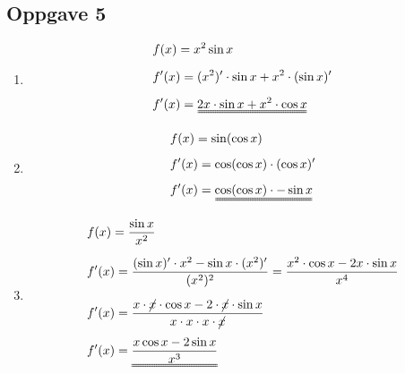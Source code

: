 \documentclass[11pt,a4paper]{report}
\newcommand{\opgd}[1]{\item[#1)]}
\newcommand{\opg}[1]{\subsection*{Oppgave #1}}
\begin{document}

\newpage
\opg{5}
\begin{enumerate}[leftmargin=*,itemsep=0.75cm,labelsep=1.5em,label=\alph*)]
\opgd{a}
\begin{align*}
&f(x) = x^2 \sin x\\[0.2cm]
&f'(x) = (x^2)' \cdot \sin x + x^2 \cdot (\sin x)'\\[0.2cm]
&f'(x) = \uuline{2x \cdot \sin x + x^2 \cdot \cos x}
\end{align*}
\opgd{b}
\begin{align*}
&f(x) = \sin(\cos x)\\[0.2cm]
&f'(x) = \cos(\cos x) \cdot (\cos x)'\\[0.2cm]
&f'(x) = \uuline{\cos(\cos x) \cdot - \sin x}
\end{align*}
\opgd{c}
\begin{align*}
&f(x) = \frac{\sin x}{x^2}\\[0.2cm]
&f'(x) = \frac{(\sin x)' \cdot x^2 - \sin x \cdot (x^2)'}{(x^2)^2} = \frac{x^2 \cdot \cos x - 2x \cdot \sin x}{x^4}\\[0.2cm]
&f'(x) = \frac{x \cdot \cancel{x} \cdot \cos x - 2 \cdot \cancel{x} \cdot \sin x}{x \cdot x \cdot x \cdot \cancel{x}}\\[0.2cm]
&f'(x) = \uuline{\frac{x \cos x - 2 \sin x}{x^3}}
\end{align*}
\end{enumerate}

\end{document}
